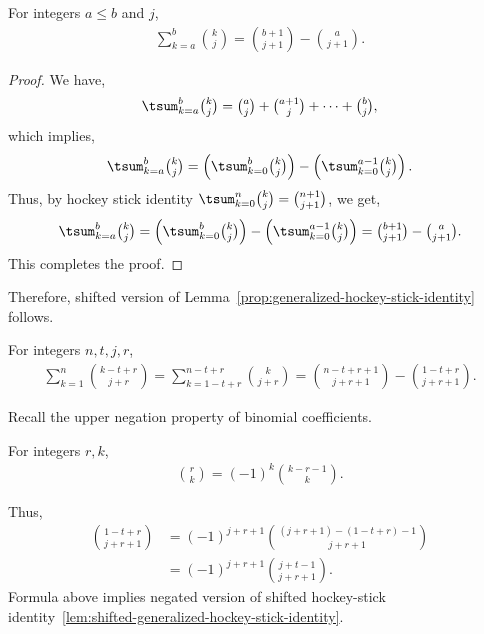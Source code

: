 \begin{lemma}
  \label{prop:generalized-hockey-stick-identity}
  For integers $a \leq b$ and $j$,
  \begin{align*}
    \sum_{k=a}^{b} \binom{k}{j} = \binom{b+1}{j+1} - \binom{a}{j+1}.
  \end{align*}
  \begin{proof}
    We have,
    \begin{align*}
      \tsum_{k=a}^{b} \tbinom{k}{j} = \tbinom{a}{j} + \tbinom{a+1}{j}
      + \cdots + \tbinom{b}{j},
    \end{align*}
    which implies,
    \begin{align*}
      \tsum_{k=a}^{b} \tbinom{k}{j} =
      \left( \tsum_{k=0}^{b} \tbinom{k}{j} \right)
      -
      \left(\tsum_{k=0}^{a-1} \tbinom{k}{j}\right).
    \end{align*}
    Thus, by hockey stick identity
    $\tsum_{k=0}^{n} \binom{k}{j} = \binom{n+1}{j+1}$,
    we get,
    \begin{align*}
      \tsum_{k=a}^{b} \tbinom{k}{j}
      =
      \left(
        \tsum_{k=0}^{b} \tbinom{k}{j}
      \right)
      -
      \left(
        \tsum_{k=0}^{a-1} \tbinom{k}{j}
      \right)
      = \tbinom{b+1}{j+1} - \tbinom{a}{j+1}.
    \end{align*}
    This completes the proof.
  \end{proof}
\end{lemma}
Therefore, shifted version of
Lemma~\eqref{prop:generalized-hockey-stick-identity}
follows.
\begin{lemma} 
  For integers $n,t,j,r$,
  \label{lem:shifted-generalized-hockey-stick-identity}
  \begin{align*}
    \sum_{k=1}^{n} \binom{k-t+r}{j+r} = \sum_{k=1-t+r}^{n-t+r} \binom{k}{j+r}
    = \binom{n-t+r+1}{j+r+1} - \binom{1-t+r}{j+r+1}.
  \end{align*}
\end{lemma}

Recall the upper negation property of binomial coefficients.

\begin{lemma} For integers $r,k$,
  \label{lem:upper-negation}
  \begin{align*}
    \binom{r}{k} = (-1)^{k} \binom{k-r-1}{k}.
  \end{align*}
\end{lemma}
Thus,
\begin{align*}
  \binom{1-t+r}{j+r+1}
  &= (-1)^{j+r+1} \binom{(j+r+1)-(1-t+r)-1}{j+r+1} \\
  &= (-1)^{j+r+1} \binom{j+t-1}{j+r+1}.
\end{align*}
Formula above implies negated version of shifted hockey-stick
identity~\eqref{lem:shifted-generalized-hockey-stick-identity}.

